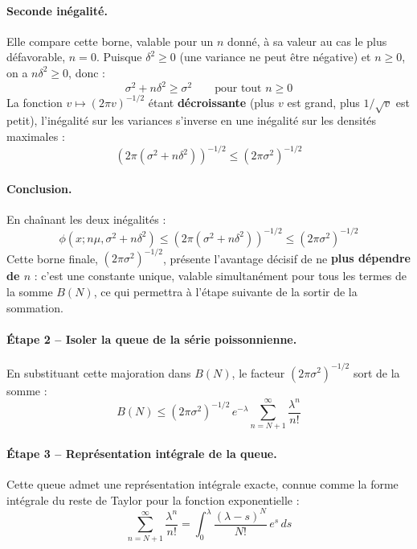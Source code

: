 \documentclass{article}
\begin{document}
\paragraph{Seconde inégalité.} Elle compare cette borne, valable pour un $n$ donné, à sa valeur au cas le plus défavorable, $n=0$. Puisque $\delta^2 \geq 0$ (une variance ne peut être négative) et $n\geq 0$, on a $n\delta^2 \geq 0$, donc :
\begin{equation}
\sigma^2 + n\delta^2 \geq \sigma^2 \qquad \text{pour tout } n \geq 0
\end{equation}
La fonction $v \mapsto (2\pi v)^{-1/2}$ étant \textbf{décroissante} (plus $v$ est grand, plus $1/\sqrt{v}$ est petit), l'inégalité sur les variances s'inverse en une inégalité sur les densités maximales :
\begin{equation}
\left(2\pi(\sigma^2+n\delta^2)\right)^{-1/2} \leq (2\pi\sigma^2)^{-1/2}
\end{equation}
\paragraph{Conclusion.} En chaînant les deux inégalités :
\begin{equation}
\phi(x;n\mu,\sigma^2+n\delta^2) \leq \left(2\pi(\sigma^2+n\delta^2)\right)^{-1/2} \leq (2\pi\sigma^2)^{-1/2}
\end{equation}
Cette borne finale, $(2\pi\sigma^2)^{-1/2}$, présente l'avantage décisif de ne \textbf{plus dépendre de $n$} : c'est une constante unique, valable simultanément pour tous les termes de la somme $B(N)$, ce qui permettra à l'étape suivante de la sortir de la sommation.
\paragraph{Étape 2 -- Isoler la queue de la série poissonnienne.} En substituant cette majoration dans $B(N)$, le facteur $(2\pi\sigma^2)^{-1/2}$ sort de la somme :
\begin{equation}
B(N) \leq (2\pi\sigma^2)^{-1/2}\, e^{-\lambda} \sum_{n=N+1}^{\infty} \frac{\lambda^n}{n!}
\end{equation}
\paragraph{Étape 3 -- Représentation intégrale de la queue.} Cette queue admet une représentation intégrale exacte, connue comme la forme intégrale du reste de Taylor pour la fonction exponentielle :
\begin{equation}
\sum_{n=N+1}^{\infty} \frac{\lambda^n}{n!} = \int_0^\lambda \frac{(\lambda-s)^N}{N!}\, e^s\, ds
\end{equation}
\end{document}
